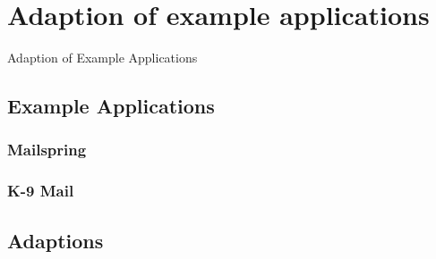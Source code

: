\chapter{Adaption of example applications}
\label{ch:adaption}


Adaption of Example Applications

\section{Example Applications}

\subsection{Mailspring}

\subsection{K-9 Mail}

\section{Adaptions}
